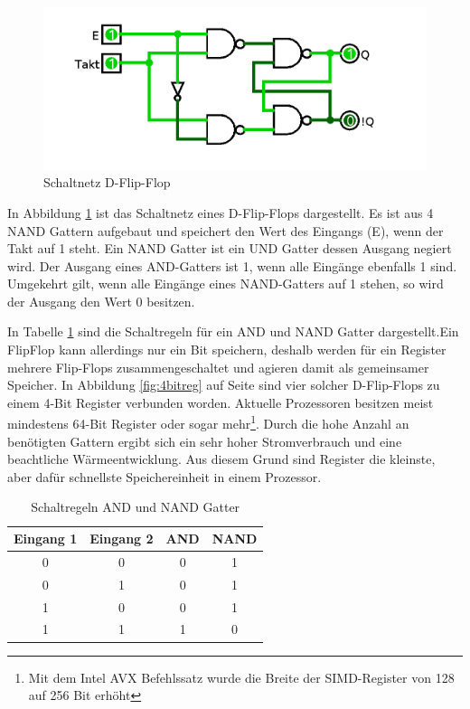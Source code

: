 \documentclass[a4paper,12pt]{article}
\begin{document}
\begin{figure}[!htb]
\centering
\includegraphics[scale=0.30]{flipflop}
\caption{Schaltnetz D-Flip-Flop}
\label{fig:flipflop}
\end{figure}

\noindent In Abbildung \ref{fig:flipflop} ist das Schaltnetz eines D-Flip-Flops dargestellt. Es ist aus 4 NAND Gattern aufgebaut und speichert den Wert des Eingangs (E), wenn der Takt auf 1 steht. Ein NAND Gatter ist ein UND Gatter dessen Ausgang negiert wird. Der Ausgang eines AND-Gatters ist 1, wenn alle Eingänge ebenfalls 1 sind. Umgekehrt gilt, wenn alle Eingänge eines NAND-Gatters auf 1 stehen, so wird der Ausgang den Wert 0 besitzen.\cite[S.12-14]{elements2005}

\noindent In Tabelle \ref{andnand} sind die Schaltregeln für ein AND und NAND Gatter dargestellt.\linebreak Ein FlipFlop kann allerdings nur ein Bit speichern, deshalb werden für ein Register mehrere Flip-Flops zusammengeschaltet und agieren damit als gemeinsamer Speicher. In Abbildung \ref{fig:4bitreg} auf Seite \pageref{page:4bitreg} sind vier solcher D-Flip-Flops zu einem 4-Bit Register verbunden worden.  Aktuelle Prozessoren besitzen meist mindestens 64-Bit Register oder sogar mehr\footnote{Mit dem Intel AVX Befehlssatz wurde die Breite der SIMD-Register von 128 auf 256 Bit erhöht\cite{lomont2011introduction}}. Durch die hohe Anzahl an benötigten Gattern ergibt sich ein sehr hoher Stromverbrauch und eine beachtliche Wärmeentwicklung. Aus diesem Grund sind Register die kleinste, aber dafür schnellste Speichereinheit in einem Prozessor.

\begin{table}[!htb]
\centering
\begin{tabular}{|c|c|c|c|}
\hline
Eingang 1 & Eingang 2 & AND & NAND \\ \hline
0         & 0         & 0   & 1    \\ \hline
0         & 1         & 0   & 1    \\ \hline
1         & 0         & 0   & 1    \\ \hline
1         & 1         & 1   & 0    \\ \hline
\end{tabular}
\caption{Schaltregeln AND und NAND Gatter}
\label{andnand}
\end{table}
\end{document}
